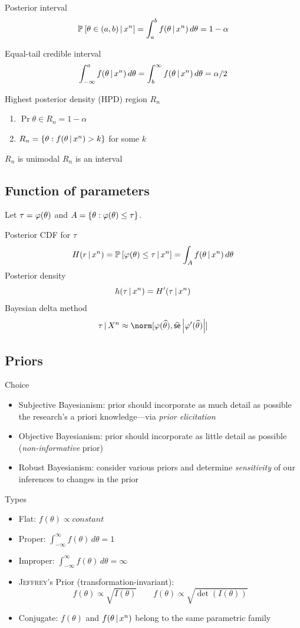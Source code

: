 \documentclass[landscape]{article}
\begin{document}
\begin{multicols*}{2}
Posterior interval
\[\mathbb{P}_{}\left[\theta\in (a,b)\,|\, x^n\right]
= \int_{a}^{b} f(\theta\,|\, x^n)\,d\theta
= 1-\alpha\]

Equal-tail credible interval
\[\int_{-\infty}^{a} f(\theta\,|\, x^n)\,d\theta
= \int_{b}^{\infty} f(\theta\,|\, x^n)\,d\theta = \alpha/2\]

Highest posterior density (HPD) region $R_n$
\begin{enumerate}
  \item $\Pr{\theta\in R_n} = 1-\alpha$
  \item $R_n = \left\{ \theta: f(\theta\,|\, x^n) > k \right\}$ for some $k$
\end{enumerate}
$R_n$ is unimodal \imp $R_n$ is an interval

\subsection{Function of parameters}
Let $\tau = \varphi(\theta)$ and $A =
\left\{ \theta:\varphi(\theta) \le \tau \right\}$.

Posterior CDF for $\tau$
\[H(r\,|\, x^n)
= \mathbb{P}_{}\left[\varphi(\theta) \le \tau\,|\, x^n\right]
= \int_A f(\theta \,|\, x^n)\,d\theta\]
Posterior density
\[h(\tau\,|\, x^n) = H'(\tau\,|\, x^n)\]
Bayesian delta method
\[\tau\giv X^n \approx \norm[\transform(\that),
\sehat\left|\transform'(\that)\right|]\]

\subsection{Priors}

Choice
\begin{itemize}
  \item Subjective Bayesianism: prior should incorporate as much detail as
    possible the research's a priori knowledge---via \emph{prior elicitation}
  \item Objective Bayesianism: prior should incorporate as little detail as
    possible (\emph{non-informative} prior)
  \item Robust Bayesianism: consider various priors and determine
    \emph{sensitivity} of our inferences to changes in the prior
\end{itemize}

Types
\begin{itemize}
  \item Flat: $f(\theta) \propto constant$
  \item Proper: $\int_{-\infty}^{\infty} f(\theta)\,d\theta = 1$
  \item Improper: $\int_{-\infty}^{\infty} f(\theta)\,d\theta = \infty$
  \item \textsc{Jeffrey}'s Prior (transformation-invariant):
    \[f(\theta) \propto \sqrt{I(\theta)} \qquad
    f(\theta) \propto \sqrt{\det(I(\theta))}\]
  \item Conjugate: $f(\theta)$ and $f(\theta\,|\, x^n)$
    belong to the same parametric family
\end{itemize}


\end{multicols*}
\end{document}
